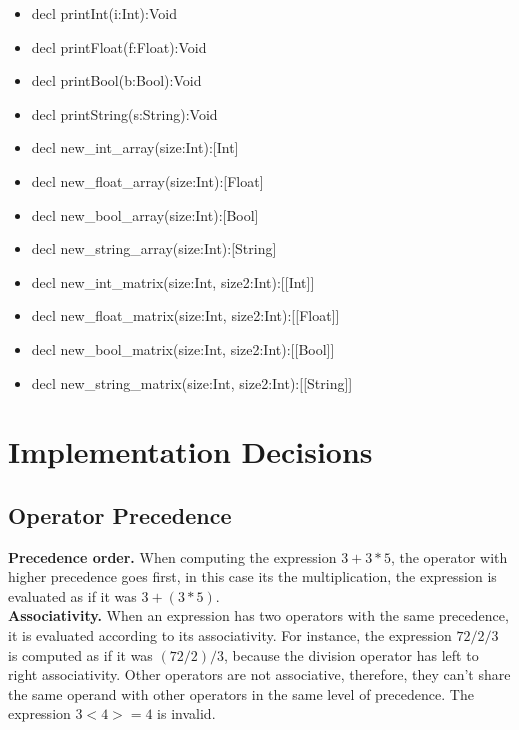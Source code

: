 \documentclass[12pt]{article}
\begin{document}
\begin{itemize}
		\item decl printInt(i:Int):Void
        \item decl printFloat(f:Float):Void
        \item decl printBool(b:Bool):Void
        \item decl printString(s:String):Void
        \item decl new\_int\_array(size:Int):[Int]
        \item decl new\_float\_array(size:Int):[Float]
        \item decl new\_bool\_array(size:Int):[Bool]
        \item decl new\_string\_array(size:Int):[String]
        \item decl new\_int\_matrix(size:Int, size2:Int):[[Int]]
        \item decl new\_float\_matrix(size:Int, size2:Int):[[Float]]
        \item decl new\_bool\_matrix(size:Int, size2:Int):[[Bool]]
        \item decl new\_string\_matrix(size:Int, size2:Int):[[String]]       

\end{itemize}

\newpage


\section{Implementation Decisions}
\subsection{Operator Precedence}

\textbf{Precedence order.} When computing the expression $3 + 3 * 5$, the operator with higher precedence goes first, in this case its the multiplication, the expression is  evaluated as if it was $3 + (3 * 5)$. \\

\textbf{Associativity.} When an expression has two operators with the same precedence, it is evaluated according to its associativity.  For instance, the expression $72 / 2 / 3$ is computed as if it was $(72 / 2) / 3$, because the division operator has left to right associativity. Other operators are not associative, therefore, they can't share the same operand with other operators in the same level of precedence. The expression $3 < 4 >= 4$ is invalid. \\
\end{document}
